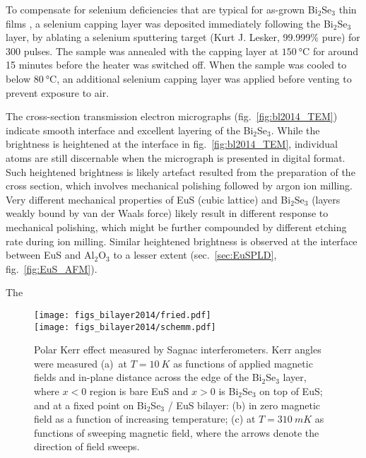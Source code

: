 To compensate for selenium deficiencies that are typical for as-grown Bi$_2$Se$_3$ thin films \cite{Zhanybek3, zhangli2012, zhangli2013, TI_ARPES1, ARPES_thickness}, a selenium capping layer was deposited immediately following the Bi$_2$Se$_3$ layer, by ablating a selenium sputtering target (Kurt J. Lesker, 99.999\% pure) for 300 pulses. The sample was annealed with the capping layer at $\SI{150}{\degreeCelsius}$ for around 15 minutes before the heater was switched off. When the sample was cooled to below $\SI{80}{\degreeCelsius}$, an additional selenium capping layer was applied before venting to prevent exposure to air.

The cross-section transmission electron micrographs (fig.~\ref{fig:bl2014_TEM}) indicate smooth interface and excellent layering of the Bi$_2$Se$_3$. While the brightness is heightened at the interface in fig.~\ref{fig:bl2014_TEM}, individual atoms are still discernable when the micrograph is presented in digital format. Such heightened brightness is likely artefact resulted from the preparation of the cross section, which involves mechanical polishing followed by argon ion milling. Very different mechanical properties of EuS (cubic lattice) and Bi$_2$Se$_3$ (layers weakly bound by van der Waals force) likely result in different response to mechanical polishing, which might be further compounded by different etching rate during ion milling. Similar heightened brightness is observed at the interface between EuS and Al$_2$O$_3$ to a lesser extent (sec.~\ref{sec:EuSPLD}, fig.~\ref{fig:EuS_AFM}).

The 
%
%
\begin{figure}[h]%
\centering%
\subfloat{\label{fig:bl2014_Fried}}%
\subfloat{\label{fig:bl2014_SchemmT}}%
\subfloat{\label{fig:bl2014_SchemmH}}%
\texttt{[image: figs\_bilayer2014/fried.pdf]}\\
\texttt{[image: figs\_bilayer2014/schemm.pdf]}
\caption[Polar Kerr effect in Bi$_2$Se$_3$ / EuS bilayers]{Polar Kerr effect measured by Sagnac interferometers. Kerr angles were measured (a)~at $T=\SI{10}{K}$ as functions of applied magnetic fields and in-plane distance across the edge of the Bi$_2$Se$_3$ layer, where $x<0$ region is bare EuS and $x>0$ is Bi$_2$Se$_3$ on top of EuS; and at a fixed point on Bi$_2$Se$_3$ / EuS bilayer: (b) in zero magnetic field as a function of increasing temperature; (c) at $T=\SI{310}{mK}$ as functions of sweeping magnetic field, where the arrows denote the direction of field sweeps.}%
\end{figure}%